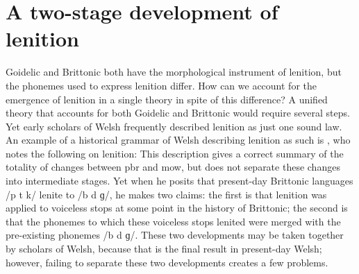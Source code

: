 \section{A two-stage development of lenition}
\label{sec:two-stage-devel}
Goidelic and Brittonic both have the morphological instrument of lenition, but the phonemes used to express lenition differ. How can we account for the emergence of lenition in a single theory in spite of this difference? A unified theory that accounts for both Goidelic and Brittonic would require several steps. Yet early scholars of Welsh  frequently described lenition as just one sound law. An example of a historical grammar of Welsh describing lenition as such is \textcite{Mor_Welsh13}, who notes the following on lenition:
This description gives a correct summary of the totality of changes between \gls{pbr} and \gls{mow}, but does not separate these changes  into intermediate stages. 
Yet when he posits that present-day Brittonic languages /p t k/ lenite to /b d ɡ/, he makes two claims: the first is that lenition was applied to voiceless stops at some point in the history of Brittonic; the second is that the phonemes to which these voiceless stops lenited were merged with the pre-existing phonemes /b d ɡ/. These two developments may be taken together by scholars of \eg Welsh, because that is the final result in present-day Welsh; however, failing to separate these two developments  creates a few problems.

